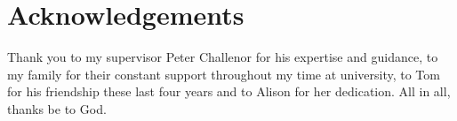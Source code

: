 
\chapter*{Acknowledgements}

Thank you to my supervisor Peter Challenor for his expertise and guidance, to my family for their constant support throughout my time at university, to Tom for his friendship these last four years and to Alison for her dedication.
All in all, thanks be to God.
